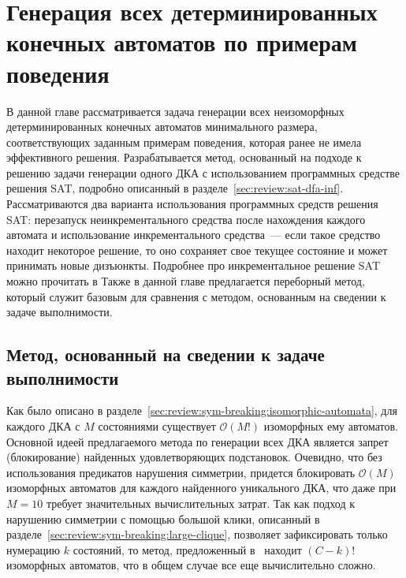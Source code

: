 
\chapter{Генерация всех детерминированных конечных автоматов по примерам поведения} 
\label{sec:findall}

В данной главе рассматривается задача генерации всех неизоморфных детерминированных конечных автоматов минимального размера, соответствующих заданным примерам поведения, которая ранее не имела эффективного решения.
Разрабатывается метод, основанный на подходе к решению задачи генерации одного ДКА с использованием программных средстве решения SAT, подробно описанный в разделе~\ref{sec:review:sat-dfa-inf}.
Рассматриваются два варианта использования программных средств решения SAT: перезапуск неинкрементального средства после нахождения каждого автомата и использование инкрементального средства~{---} если такое средство находит некоторое решение, то оно сохраняет свое текущее состояние и может принимать новые дизъюнкты.
Подробнее про инкрементальное решение SAT можно прочитать в%
Также в данной главе предлагается переборный метод, который служит базовым для сравнения с методом, основанным на сведении к задаче выполнимости.


\section{Метод, основанный на сведении к задаче выполнимости}
\label{sec:findall:SAT-based}

Как было описано в разделе~\ref{sec:review:sym-breaking:isomorphic-automata}, для каждого ДКА с $M$ состояниями существует $\mathcal{O}\left(M!\right)$ изоморфных ему автоматов.
Основной идеей предлагаемого метода по генерации всех ДКА является запрет (блокирование) найденных удовлетворяющих подстановок.
Очевидно, что без использования предикатов нарушения симметрии, придется блокировать $\mathcal{O}\left(M\right)$ изоморфных автоматов для каждого найденного уникального ДКА, что даже при $M = 10$ требует значительных вычислительных затрат.
Так как подход к нарушению симметрии с помощью большой клики, описанный в разделе~\ref{sec:review:sym-breaking:large-clique}, позволяет зафиксировать только нумерацию $k$ состояний, то метод, предложенный в~\cite{heule-icgi10} находит $\left(C - k\right)!$ изоморфных автоматов, что в общем случае все еще вычислительно сложно.

